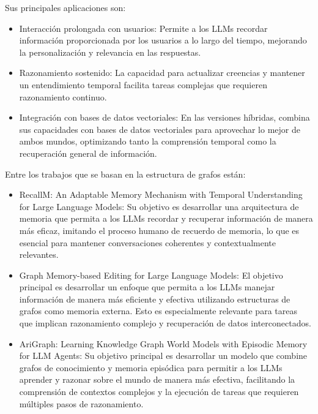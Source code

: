 \documentclass{article}
\begin{document}
Sus principales aplicaciones son:
\begin{itemize}
    \item Interacción prolongada con usuarios: Permite a los LLMs recordar información proporcionada por los usuarios a lo largo del tiempo, mejorando la personalización y relevancia en las respuestas.
    \item Razonamiento sostenido: La capacidad para actualizar creencias y mantener un entendimiento temporal facilita tareas complejas que requieren razonamiento continuo.
    \item Integración con bases de datos vectoriales: En las versiones híbridas, combina sus capacidades con bases de datos vectoriales para aprovechar lo mejor de ambos mundos, optimizando tanto la comprensión temporal como la recuperación general de información.
\end{itemize}

Entre los trabajos que se basan en la estructura de grafos están:
\begin{itemize}
    \item RecallM: An Adaptable Memory Mechanism with Temporal Understanding for Large Language Models: Su objetivo es desarrollar una arquitectura de memoria que permita a los LLMs recordar y recuperar información de manera más eficaz, imitando el proceso humano de recuerdo de memoria, lo que es esencial para mantener conversaciones coherentes y contextualmente relevantes.
    \item Graph Memory-based Editing for Large Language Models: El objetivo principal es desarrollar un enfoque que permita a los LLMs manejar información de manera más eficiente y efectiva utilizando estructuras de grafos como memoria externa. Esto es especialmente relevante para tareas que implican razonamiento complejo y recuperación de datos interconectados.
    \item AriGraph: Learning Knowledge Graph World Models with Episodic Memory for LLM Agents: Su objetivo principal es desarrollar un modelo que combine grafos de conocimiento y memoria episódica para permitir a los LLMs aprender y razonar sobre el mundo de manera más efectiva, facilitando la comprensión de contextos complejos y la ejecución de tareas que requieren múltiples pasos de razonamiento.
\end{itemize}
\end{document}

